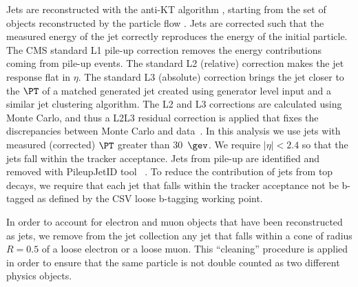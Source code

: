 Jets are reconstructed with the anti-KT algorithm \cite{cacciari},
starting from the set of objects reconstructed by the particle flow
\cite{pflow,CMS-PAS-JME-10-003,CMS-PAS-PFT-10-002}.  Jets are
corrected such that the measured energy of the jet correctly
reproduces the energy of the initial particle.  The CMS standard L1
pile-up correction removes the energy contributions coming from pile-up
events. The standard L2
(relative) correction makes the jet response flat in $\eta$.  The
standard L3 (absolute) correction brings the jet closer to the $\PT$
of a matched generated jet created using generator level input and a
similar jet clustering algorithm.  The L2 and L3 corrections are
calculated using Monte Carlo, and thus a L2L3 residual correction is
applied that fixes the discrepancies between Monte Carlo and
data~\cite{newjes-cms}.  In this analysis we use jets with measured
(corrected) $\PT$ greater than 30~$\gev$.  We require $|\eta| < 2.4$
so that the jets fall within the tracker acceptance. Jets from pile-up
are identified and removed with PileupJetID tool
~\cite{cite:PileupJetID}.  To reduce the contribution of jets from top
decays, we require that each jet that falls within the tracker
acceptance not be b-tagged as defined by the CSV loose b-tagging
working point.


\par
In order to account for electron and muon objects that have been
reconstructed as jets, we remove from the jet collection any jet that
falls within a cone of radius $R= 0.5$ of a loose electron or a loose
muon.  This ``cleaning'' procedure is applied in order to ensure that
the same particle is not double counted as two different physics
objects.



